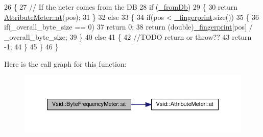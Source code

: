 \begin{DoxyCode}
26 \{
27     \textcolor{comment}{// If the neter comes from the DB}
28     \textcolor{keywordflow}{if} (\hyperlink{class_vsid_1_1_attribute_meter_a2ce3946fc699d3c375ee4019a9e3c022}{\_fromDb})
29     \{
30         \textcolor{keywordflow}{return} \hyperlink{class_vsid_1_1_attribute_meter_a3b067be638ae613a732fa090c07c5e71}{AttributeMeter::at}(pos);
31     \}
32     \textcolor{keywordflow}{else}
33     \{
34         \textcolor{keywordflow}{if}(pos < \hyperlink{class_vsid_1_1_attribute_meter_a0386b2fe9c5d6ab6fba16029d8da4efe}{\_fingerprint}.size())
35         \{
36             \textcolor{keywordflow}{if}(\_overall\_byte\_size == 0)
37                 \textcolor{keywordflow}{return} 0;
38             \textcolor{keywordflow}{return} (\textcolor{keywordtype}{double})\hyperlink{class_vsid_1_1_attribute_meter_a0386b2fe9c5d6ab6fba16029d8da4efe}{\_fingerprint}[pos] / \_overall\_byte\_size;
39         \}
40         \textcolor{keywordflow}{else}
41         \{
42             \textcolor{comment}{//TODO return or throw??}
43             \textcolor{keywordflow}{return} -1;
44         \}
45     \}
46 \}
\end{DoxyCode}


Here is the call graph for this function\-:
\nopagebreak
\begin{figure}[H]
\begin{center}
\leavevmode
\includegraphics[width=350pt]{class_vsid_1_1_byte_frequency_meter_ab6541bcfde5db47e37fdfea6d43b36e5_cgraph}
\end{center}
\end{figure}



